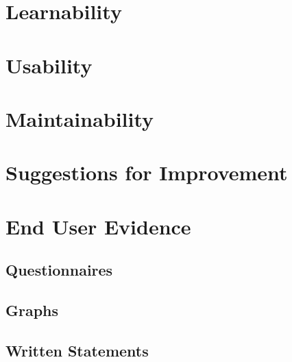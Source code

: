 \section{Learnability}

\section{Usability}

\section{Maintainability}

\section{Suggestions for Improvement}

\section{End User Evidence}

\pagebreak
\subsection{Questionnaires}
































\subsection{Graphs}

\subsection{Written Statements}
